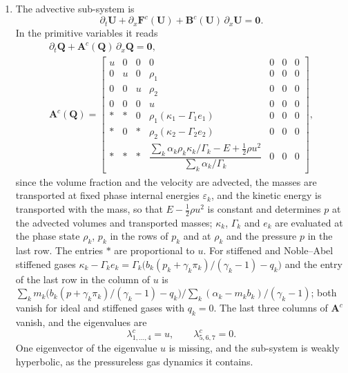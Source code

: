 \begin{enumerate}
\item The advective sub-system is
\begin{equation}
\partial_t\mathbf U+\partial_x\mathbf F^c(\mathbf U)+\mathbf B^c(\mathbf U)\,\partial_x\mathbf U=\mathbf 0 .
\label{eq:advective}
\end{equation}
In the primitive variables it reads
\begin{equation}
\begin{gathered}
\partial_t\mathbf Q+\mathbf A^c(\mathbf Q)\,\partial_x\mathbf Q=\mathbf 0,\\
\mathbf A^c(\mathbf Q)=\begin{bmatrix}
u&0&0&0&0&0&0\\
0&u&0&\rho_1&0&0&0\\
0&0&u&\rho_2&0&0&0\\
0&0&0&u&0&0&0\\
\ast&\ast&0&\rho_1(\kappa_1-\Gamma_1e_1)&0&0&0\\
\ast&0&\ast&\rho_2(\kappa_2-\Gamma_2e_2)&0&0&0\\
\ast&\ast&\ast&\dfrac{\sum_k\alpha_k\rho_k\kappa_k/\Gamma_k-E+\tfrac12\rho u^2}{\sum_k\alpha_k/\Gamma_k}&0&0&0
\end{bmatrix},
\end{gathered}
\label{eq:Ac}
\end{equation}
since the volume fraction and the velocity are advected, the masses are transported at fixed phase internal energies
$\varepsilon_k$, and the kinetic energy is transported with the mass, so that $E-\tfrac12\rho u^2$ is constant and determines $p$ at the
advected volumes and transported masses; $\kappa_k$, $\Gamma_k$ and $e_k$ are evaluated at the phase state $\rho_k$, $p_k$ in the rows of $p_k$
and at $\rho_k$ and the pressure $p$ in the last row. The entries $\ast$ are proportional to $u$. For stiffened and Noble--Abel stiffened gases $\kappa_k-\Gamma_ke_k=\Gamma_k\big(b_k(p_k+\gamma_k\pi_k)/(\gamma_k-1)-q_k\big)$ and
the entry of the last row in the column of $u$ is $\sum_km_k\big(b_k(p+\gamma_k\pi_k)/(\gamma_k-1)-q_k\big)\big/\sum_k(\alpha_k-m_kb_k)/(\gamma_k-1)$; both vanish for ideal and stiffened gases
with $q_k=0$. The last three columns of $\mathbf A^c$ vanish, and the eigenvalues are
\begin{equation}
\lambda^c_{1,\dots,4}=u,\qquad \lambda^c_{5,6,7}=0 .
\label{eq:eig_adv}
\end{equation}
One eigenvector of the eigenvalue $u$ is missing, and the sub-system is weakly hyperbolic, as the pressureless gas dynamics it contains.

\end{enumerate}
